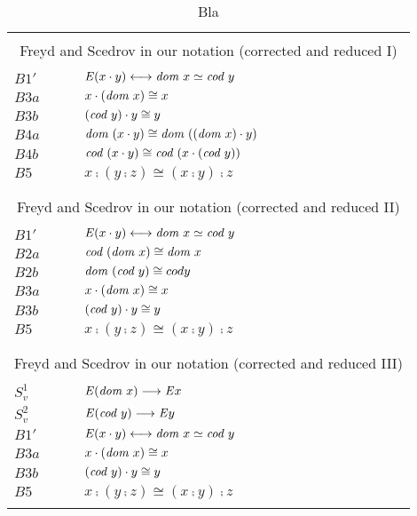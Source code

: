 \begin{table} \centering \normalsize
\begin{tabular}{ll}
\\
\hline
\\
\multicolumn{2}{c}{Freyd and Scedrov in our notation (corrected and
  reduced I)} \\
\\
  $B1'$  & $\mathit{E} (x \cdot y) \longleftrightarrow \textit{dom \/} x \simeq\textit{cod \/} y$ \\
  $B3a$  & $x \cdot (\textit{dom \/} x) \cong x$ \\ 
  $B3b$ & $(\textit{cod \/} y) \cdot y \cong y$ \\
  $B4a$ & $\textit{dom \/}(x \cdot y) \cong \textit{dom \/}((\textit{dom \/} x) \cdot y)$ \\ 
  $B4b$ & $\textit{cod \/}(x \cdot y) \cong \textit{cod \/}(x \cdot (\textit{cod \/} y))$ \\ 
  $B5$   & $x \comp (y \comp z) \cong  (x \comp y) \comp z$   \\
\\
\hline
\\
\multicolumn{2}{c}{Freyd and Scedrov in our notation (corrected and
  reduced II)} \\
\\
  $B1'$  & $\mathit{E} (x \cdot y) \longleftrightarrow \textit{dom \/} x \simeq\textit{cod \/} y$ \\
  $B2a$ & $\textit{cod \/}(\textit{dom \/} x) \cong \textit{dom \/} x$ \\  
  $B2b$ & $\textit{dom \/}(\textit{cod \/} y) \cong cod y$ \\  
  $B3a$  & $x \cdot (\textit{dom \/} x) \cong x$ \\ 
  $B3b$ & $(\textit{cod \/} y) \cdot y \cong y$ \\
  $B5$   & $x \comp (y \comp z) \cong  (x \comp y) \comp z$   \\
\\
\hline
\\
\multicolumn{2}{c}{Freyd and Scedrov in our notation (corrected and
  reduced III)} \\
\\
 $S^1_{v}$ & $\mathit{E} (\textit{dom \/} x) \longrightarrow \mathit{E} x$ \\
  $S^2_{v}$ & $\mathit{E} (\textit{cod \/} y) \longrightarrow \mathit{E} y$ \\
  $B1'$  & $\mathit{E} (x \cdot y) \longleftrightarrow \textit{dom \/} x \simeq\textit{cod \/} y$ \\
  $B3a$  & $x \cdot (\textit{dom \/} x) \cong x$ \\ 
  $B3b$ & $(\textit{cod \/} y) \cdot y \cong y$ \\
  $B5$   & $x \comp (y \comp z) \cong  (x \comp y) \comp z$   \\
\\
\hline
\end{tabular}
\caption{Bla}
\end{table}


